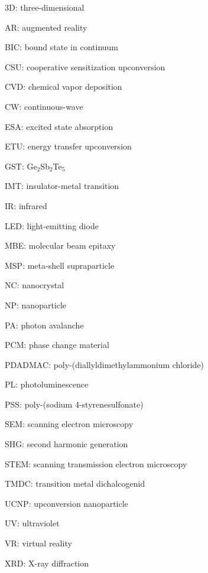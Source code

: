 \documentclass[journal=chreay,manuscript=review]{achemso}
\begin{document}
3D: three-dimensional

AR: augmented reality

BIC: bound state in continuum

CSU: cooperative sensitization upconversion

CVD: chemical vapor deposition 

CW: continuous-wave

ESA: excited state absorption

ETU: energy transfer upconversion 

GST: Ge$_2$Sb$_2$Te$_5$

IMT: insulator-metal transition

IR: infrared

LED: light-emitting diode

MBE: molecular beam epitaxy 

MSP: meta-shell supraparticle 

NC: nanocrystal

NP: nanoparticle

PA: photon avalanche

PCM: phase change material

PDADMAC: poly-(diallyldimethylammonium chloride)

PL: photoluminescence 

PSS: poly-(sodium 4-styrenesulfonate)

SEM: scanning electron microscopy

SHG: second harmonic generation

STEM: scanning transmission electron microscopy

TMDC: transition metal dichalcogenid

UCNP: upconversion nanoparticle

UV: ultraviolet

VR: virtual reality

XRD: X-ray diffraction 


\newpage 





%

\end{document}
